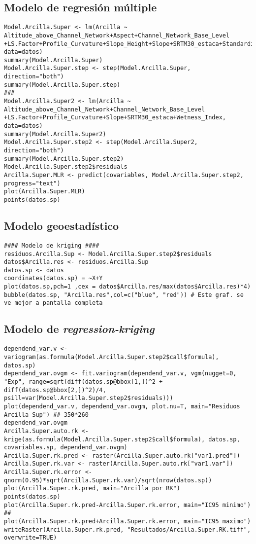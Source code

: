 \documentclass[10pt,a4paper]{article}
\begin{document}
\subsection{Modelo de regresión múltiple}
\begin{lstlisting}
Model.Arcilla.Super <- lm(Arcilla ~ Altitude_above_Channel_Network+Aspect+Channel_Network_Base_Level
+LS.Factor+Profile_Curvature+Slope_Height+Slope+SRTM30_estaca+Standardized_Height+Valley_Depth+Wetness_Index, data=datos)
summary(Model.Arcilla.Super)
Model.Arcilla.Super.step <- step(Model.Arcilla.Super, direction="both")
summary(Model.Arcilla.Super.step)
###
Model.Arcilla.Super2 <- lm(Arcilla ~ Altitude_above_Channel_Network+Channel_Network_Base_Level
+LS.Factor+Profile_Curvature+Slope+SRTM30_estaca+Wetness_Index, data=datos)
summary(Model.Arcilla.Super2)
Model.Arcilla.Super.step2 <- step(Model.Arcilla.Super2, direction="both")
summary(Model.Arcilla.Super.step2)
Model.Arcilla.Super.step2$residuals
Arcilla.Super.MLR <- predict(covariables, Model.Arcilla.Super.step2, progress="text")
plot(Arcilla.Super.MLR)
points(datos.sp)
\end{lstlisting}

\subsection{Modelo geoestadístico}
\begin{lstlisting}
#### Modelo de kriging ####
residuos.Arcilla.Sup <- Model.Arcilla.Super.step2$residuals
datos$Arcilla.res <- residuos.Arcilla.Sup
datos.sp <- datos
coordinates(datos.sp) = ~X+Y
plot(datos.sp,pch=1 ,cex = datos$Arcilla.res/max(datos$Arcilla.res)*4)
bubble(datos.sp, "Arcilla.res",col=c("blue", "red")) # Este graf. se ve mejor a pantalla completa
\end{lstlisting}

\subsection{Modelo de \textit{regression-kriging}}
\begin{lstlisting}
dependend_var.v <- variogram(as.formula(Model.Arcilla.Super.step2$call$formula), datos.sp)
dependend_var.ovgm <- fit.variogram(dependend_var.v, vgm(nugget=0, "Exp", range=sqrt(diff(datos.sp@bbox[1,])^2 + diff(datos.sp@bbox[2,])^2)/4, psill=var(Model.Arcilla.Super.step2$residuals)))
plot(dependend_var.v, dependend_var.ovgm, plot.nu=T, main="Residuos Arcilla Sup") ## 350*260
dependend_var.ovgm
Arcilla.Super.auto.rk <- krige(as.formula(Model.Arcilla.Super.step2$call$formula), datos.sp, covariables.sp, dependend_var.ovgm)
Arcilla.Super.rk.pred <- raster(Arcilla.Super.auto.rk["var1.pred"])
Arcilla.Super.rk.var <- raster(Arcilla.Super.auto.rk["var1.var"])
Arcilla.Super.rk.error <- qnorm(0.95)*sqrt(Arcilla.Super.rk.var)/sqrt(nrow(datos.sp))
plot(Arcilla.Super.rk.pred, main="Arcilla por RK")
points(datos.sp)
plot(Arcilla.Super.rk.pred-Arcilla.Super.rk.error, main="IC95 minimo") ## 
plot(Arcilla.Super.rk.pred+Arcilla.Super.rk.error, main="IC95 maximo")
writeRaster(Arcilla.Super.rk.pred, "Resultados/Arcilla.Super.RK.tiff", overwrite=TRUE)
\end{lstlisting}
\end{document}

